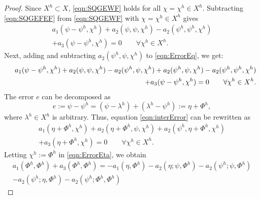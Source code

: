 \begin{proof}
  Since $X^h \subset X$, \eqref{eqn:SQGEWF} holds for all $\chi = \chi^h\in X^h$.
  Subtracting \eqref{eqn:SQGEFEF} from \eqref{eqn:SQGEWF} with $\chi=\chi^h \in
  X^h$ gives
  \begin{equation}
    \begin{split}
      a_1(\psi - \psi^h,\chi^h) + a_2(\psi,\psi,\chi^h) -
      a_2(\psi^h,\psi^h,\chi^h) \\
      + a_3(\psi-\psi^h,\chi^h) = 0 \qquad \forall \chi^h \in
    X^h.
  \end{split}
    \label{eqn:ErrorEq}
  \end{equation}
  Next, adding and subtracting $a_2(\psi^h,\psi,\chi^h)$ to \eqref{eqn:ErrorEq}, we get:
  \begin{eqnarray}
      && a_1(\psi - \psi^h,\chi^h) + a_2(\psi,\psi,\chi^h) - a_2(\psi^h,\psi,\chi^h) %
      + a_2(\psi^h,\psi,\chi^h) - a_2(\psi^h,\psi^h,\chi^h) \nonumber \\
      && \hspace*{3.0cm} + a_3(\psi-\psi^h,\chi^h) = 0 \qquad \forall \chi^h \in X^h.
    \label{eqn:interError}
  \end{eqnarray}
  The error $e$ can be decomposed as
  \begin{equation}
    e:= \psi-\psi^h = (\psi-\lambda^h)+(\lambda^h-\psi^h):= \eta + \Phi^h,
    \label{eqn:ErrorTrick}
  \end{equation}
  where $\lambda^h\in X^h$ is arbitrary.
  Thus, equation \eqref{eqn:interError} can be
  rewritten as
  \begin{equation}
    \begin{split}
      a_1(\eta+\Phi^h,\chi^h)+a_2(\eta+\Phi^h,\psi,\chi^h)+a_2(\psi^h,\eta+\Phi^h,\chi^h) \\
      + a_3(\eta+\Phi^h,\chi^h)=0 \qquad \forall \chi^h \in X^h.
    \end{split}
    \label{eqn:ErrorEta}
  \end{equation}
  Letting $\chi^h := \Phi^h$ in \eqref{eqn:ErrorEta}, we obtain
  \begin{equation}
    \begin{split}
      a_1(\Phi^h,\Phi^h) + a_3(\Phi^h,\Phi^h) = -a_1(\eta,\Phi^h)
      - a_2(\eta;\psi,\Phi^h) - a_2(\psi^h;\psi,\Phi^h) \\
      - a_2(\psi^h;\eta,\Phi^h) - a_2(\psi^h;\Phi^h,\Phi^h)

\end{split}
\end{equation}
\end{proof}
